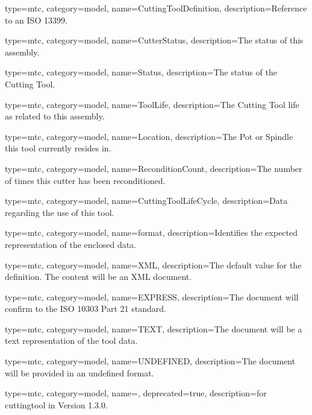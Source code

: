 {
  type=mtc,
  category=model,
  name={CuttingToolDefinition},
  description={Reference to an ISO 13399.}
}


{
  type=mtc,
  category=model,
  name={CutterStatus},
  description={The status of this assembly.}
}


{
  type=mtc,
  category=model,
  name={Status},
  description={The status of the Cutting Tool.}
}


{
  type=mtc,
  category=model,
  name={ToolLife},
  description={The Cutting Tool life as related to this assembly.}
}


{
  type=mtc,
  category=model,
  name={Location},
  description={The Pot or Spindle this tool currently resides in.}
}


{
  type=mtc,
  category=model,
  name={ReconditionCount},
  description={The number of times this cutter has been reconditioned.}
}


{
  type=mtc,
  category=model,
  name={CuttingToolLifeCycle},
  description={Data regarding the use of this tool.}
}


{
  type=mtc,
  category=model,
  name={format},
  description={Identifies the expected representation of the enclosed data.}
}


{
  type=mtc,
  category=model,
  name={XML},
  description={The default value for the definition. The content will be an XML document.}
}


{
  type=mtc,
  category=model,
  name={EXPRESS},
  description={The document will confirm to the ISO 10303 Part 21 standard.}
}


{
  type=mtc,
  category=model,
  name={TEXT},
  description={The document will be a text representation of the tool data.}
}


{
  type=mtc,
  category=model,
  name={UNDEFINED},
  description={The document will be provided in an undefined format.}
}


{
  type=mtc,
  category=model,
  name=,
  deprecated={true},
  description={\DEPRECATED for \gls{cuttingtool} in Version 1.3.0.   \newline {}}
}


